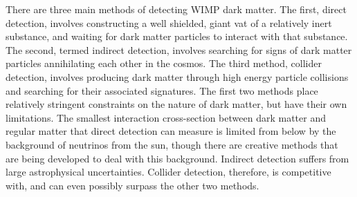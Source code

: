 There are three main methods of detecting WIMP dark matter. The first, direct detection, involves constructing a well shielded, giant vat of a relatively inert substance, and waiting for dark matter particles to interact with that substance. The second, termed indirect detection, involves searching for signs of dark matter particles annihilating each other in the cosmos. The third method, collider detection, involves producing dark matter through high energy particle collisions and searching for their associated signatures. The first two methods place relatively stringent constraints on the nature of dark matter, but have their own limitations. The smallest interaction cross-section between dark matter and regular matter that direct detection can measure is limited from below by the background of neutrinos from the sun, though there are creative methods that are being developed to deal with this background. Indirect detection suffers from large astrophysical uncertainties. Collider detection, therefore, is competitive with, and can even possibly surpass the other two methods.

\newcommand{\cb}{ c_\beta}
\newcommand{\cw}{ c_W}
\newcommand{\sinb}{ s_\beta}
\newcommand{\sw}{ s_W}
\newcommand{\mz}{ m_Z}

